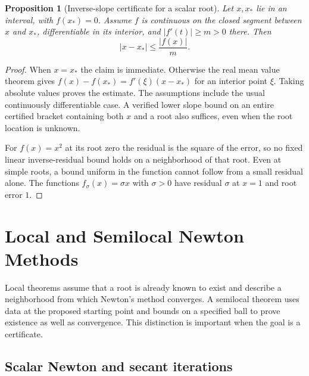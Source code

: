 \documentclass[11pt,oneside,openany]{book}
\theoremstyle{plain}
\newtheorem{proposition}[theorem]{Proposition}
\theoremstyle{definition}
\theoremstyle{remark}
\begin{document}
\begin{proposition}[Inverse-slope certificate for a scalar root]\label{p206:W72}
Let \(x,x_*\) lie in an interval, with \(f(x_*)=0\). Assume \(f\)
is continuous on the closed segment between \(x\) and \(x_*\),
differentiable in its interior, and \(\lvert f'(t)\rvert\ge m>0\)
there. Then
\[
 \lvert x-x_*\rvert\le\frac{\lvert f(x)\rvert}{m}.
\]
\end{proposition}
\begin{proof}
When \(x=x_*\) the claim is immediate. Otherwise the real mean value
theorem \cite[entry \texttt{K03.05.lagrange}]{d03} gives
\(f(x)-f(x_*)=f'(\xi)(x-x_*)\) for an interior point \(\xi\).
Taking absolute values proves the estimate. The assumptions include
the usual continuously differentiable case. A verified lower slope bound
on an entire certified bracket containing both \(x\) and a root also
suffices, even when the root location is unknown.

For \(f(x)=x^2\) at its root zero the residual is the square of the
error, so no fixed linear inverse-residual bound holds on a
neighborhood of that root. Even at simple roots, a bound uniform
in the function cannot follow from a small residual alone.
The functions \(f_\sigma(x)=\sigma x\) with \(\sigma>0\) have
residual \(\sigma\) at \(x=1\) and root error \(1\).
\end{proof}
\chapter{Local and Semilocal Newton Methods}

Local theorems assume that a root is already known to exist and
describe a neighborhood from which Newton's method converges.
A semilocal theorem uses data at the proposed starting point and
bounds on a specified ball to prove existence as well as convergence.
This distinction is important when the goal is a certificate.

\section{Scalar Newton and secant iterations}
\end{document}

